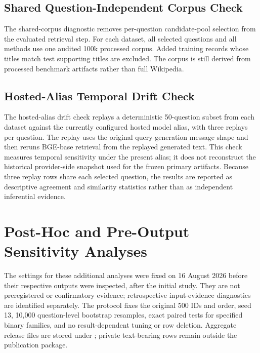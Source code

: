 \documentclass[pdflatex,sn-basic,Numbered]{sn-jnl}
\begin{document}






\subsection{Shared Question-Independent Corpus Check}
\label{supp:sec:shared_corpus_check}

The shared-corpus diagnostic removes per-question candidate-pool selection from the evaluated retrieval step. For each dataset, all selected questions and all methods use one audited 100k processed corpus. Added training records whose titles match test supporting titles are excluded. The corpus is still derived from processed benchmark artifacts rather than full Wikipedia.



\subsection{Hosted-Alias Temporal Drift Check}
\label{supp:sec:hosted_alias_drift}

The hosted-alias drift check replays a deterministic 50-question subset from each dataset against the currently configured hosted model alias, with three replays per question. The replay uses the original query-generation message shape and then reruns BGE-base retrieval from the replayed generated text. This check measures temporal sensitivity under the present alias; it does not reconstruct the historical provider-side snapshot used for the frozen primary artifacts. Because three replay rows share each selected question, the results are reported as descriptive agreement and similarity statistics rather than as independent inferential evidence.



\section{Post-Hoc and Pre-Output Sensitivity Analyses}
\label{sec:supp_plan_b_sensitivity}

The settings for these additional analyses were fixed on 16 August 2026 before their respective outputs were inspected, after the initial study. They are not preregistered or confirmatory evidence; retrospective input-evidence diagnostics are identified separately. The protocol fixes the original 500 IDs and order, seed 13, 10,000 question-level bootstrap resamples, exact paired tests for specified binary families, and no result-dependent tuning or row deletion. Aggregate release files are stored under ; private text-bearing rows remain outside the publication package.
\end{document}
